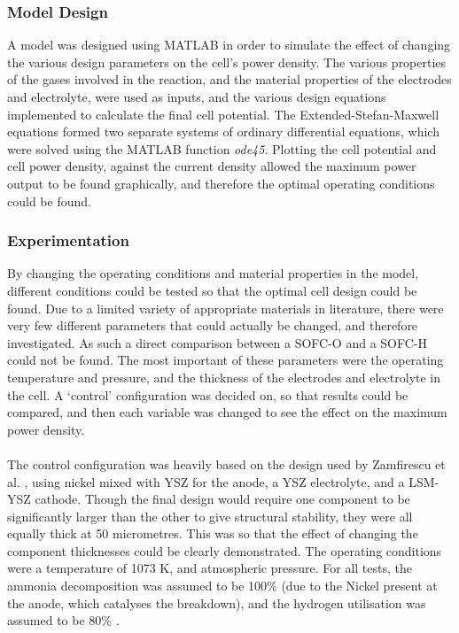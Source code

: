 \documentclass{article}
\begin{document}
    \subsubsection{Model Design}
    A model was designed using MATLAB in order to simulate the effect of changing the various design parameters on the cell's power density. The various properties of the gases involved in the reaction, and the material properties of the electrodes and electrolyte, were used as inputs, and the various design equations implemented to calculate the final cell potential. The Extended-Stefan-Maxwell equations formed two separate systems of ordinary differential equations, which were solved using the MATLAB function \textit{ode45}. Plotting the cell potential and cell power density, against the current density allowed the maximum power output to be found graphically, and therefore the optimal operating conditions could be found.
    
    \subsubsection{Experimentation}
    By changing the operating conditions and material properties in the model, different conditions could be tested so that the optimal cell design could be found. Due to a limited variety of appropriate materials in literature, there were very few different parameters that could actually be changed, and therefore investigated. As such a direct comparison between a SOFC-O and a SOFC-H could not be found. The most important of these parameters were the operating temperature and pressure, and the thickness of the electrodes and electrolyte in the cell. A `control' configuration was decided on, so that results could be compared, and then each variable was changed to see the effect on the maximum power density.\\
\hspace{1cm}\\
The control configuration was heavily based on the design used by Zamfirescu et al. \cite{LM5}, using nickel mixed with YSZ for the anode, a YSZ electrolyte, and a LSM-YSZ cathode. Though the final design would require one component to be significantly larger than the other to give structural stability, they were all equally thick at 50 micrometres. This was so that the effect of changing the component thicknesses could be clearly demonstrated. The operating conditions were a temperature of 1073 K, and atmospheric pressure. For all tests, the ammonia decomposition was assumed to be 100\% (due to the Nickel present at the anode, which catalyses the breakdown), and the hydrogen utilisation was assumed to be 80\% \cite{LM20}.
\end{document}
